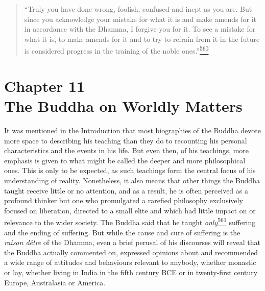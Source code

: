 \begin{quote}
``Truly you have done wrong, foolish, confused and inept as you are. But
since you acknowledge your mistake for what it is and make amends for it
in accordance with the Dhamma, I forgive you for it. To see a mistake
for what it is, to make amends for it and to try to refrain from it in
the future is considered progress in the training of the noble
ones.''\label{footprints_split_014.html_fnref560}\hyperref[footprints_split_025.htmlux5cux23fn560]{\textsuperscript{560}}
\end{quote}

\label{footprints_split_014.html_calibre_pb_29}

\label{footprints_split_015.html}{}

\section{\texorpdfstring{{Chapter 11}\\
The Buddha on Worldly
Matters}{Chapter 11 The Buddha on Worldly Matters}}\label{footprints_split_015.html_TOCTarget11}

It was mentioned in the {Introduction} that most biographies of the
Buddha devote more space to describing his teaching than they do to
recounting his personal characteristics and the events in his life. But
even then, of his teachings, more emphasis is given to what might be
called the deeper and more philosophical ones. This is only to be
expected, as such teachings form the central focus of his understanding
of reality. Nonetheless, it also means that other things the Buddha
taught receive little or no attention, and as a result, he is often
perceived as a profound thinker but one who promulgated a rarefied
philosophy exclusively focused on liberation, directed to a small elite
and which had little impact on or relevance to the wider society. The
Buddha said that he taught
\emph{only}\label{footprints_split_015.html_fnref561}\hyperref[footprints_split_025.htmlux5cux23fn561]{\textsuperscript{561}}
suffering and the ending of suffering. But while the cause and cure of
suffering is the \emph{raison d\textquotesingle être} of the Dhamma,
even a brief perusal of his discourses will reveal that the Buddha
actually commented on, expressed opinions about and recommended a wide
range of attitudes and behaviours relevant to anybody, whether monastic
or lay, whether living in India in the fifth century BCE or in
twenty-first century Europe, Australasia or America.

